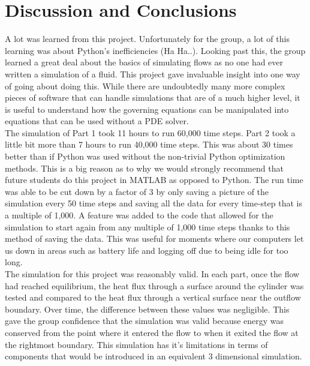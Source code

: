 \section{Discussion and Conclusions}


A lot was learned from this project. Unfortunately for the group, a lot of this learning was about Python's inefficiencies (Ha Ha..). Looking past this, the group learned a great deal about the basics of simulating flows as no one had ever written a simulation of a fluid. This project gave invaluable insight into one way of going about doing this. While there are undoubtedly many more complex pieces of software that can handle simulations that are of a much higher level, it is useful to understand how the governing equations can be manipulated into equations that can be used without a PDE solver. \\


The simulation of Part 1 took 11 hours to run 60,000 time steps. Part 2 took a little bit more than 7 hours to run 40,000 time steps. This was about 30 times better than if Python was used without the non-trivial Python optimization methods. This is a big reason as to why we would strongly recommend that future students do this project in MATLAB as opposed to Python. The run time was able to be cut down by a factor of 3 by only saving a picture of the simulation every 50 time steps and saving all the data for every time-step that is a multiple of 1,000. A feature was added to the code that allowed for the simulation to start again from any multiple of 1,000 time steps thanks to this method of saving the data. This was useful for moments where our computers let us down in areas such as battery life and logging off due to being idle for too long. \\


The simulation for this project was reasonably valid. In each part, once the flow had reached equilibrium, the heat flux through a surface around the cylinder was tested and compared to the heat flux through a vertical surface near the outflow boundary. Over time, the difference between these values was negligible. This gave the group confidence that the simulation was valid because energy was conserved from the point where it entered the flow to when it exited the flow at the rightmost boundary. This simulation has it's limitations in terms of components that would be introduced in an equivalent 3 dimensional simulation.  \\


